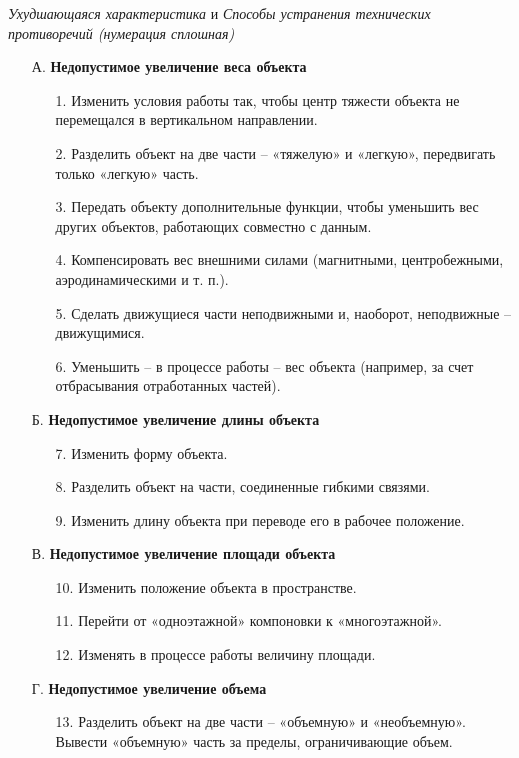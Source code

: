 \documentclass[11pt,a4paper]{article}
\begin{document}
\emph{Ухудшающаяся характеристика} и \emph{Способы устранения технических
  противоречий (нумерация сплошная)} 
\begin{itemize}
\item[А.] \textbf{Недопустимое увеличение веса объекта}
  \begin{itemize}
  \item[1.] Изменить условия работы так, чтобы центр тяжести объекта не
    перемещался в вертикальном направлении.
  \item[2.] Разделить объект на две части -- «тяжелую» и «легкую», передвигать
    только «легкую» часть.
  \item[3.] Передать объекту дополнительные функции, чтобы уменьшить вес
    других объектов, работающих совместно с данным.
  \item[4.] Компенсировать вес внешними силами (магнитными, центробежными,
    аэродинамическими и т. п.).
  \item[5.] Сделать движущиеся части неподвижными и, наоборот, неподвижные --
    движущимися.
  \item[6.] Уменьшить -- в процессе работы -- вес объекта (например, за счет
    отбрасывания отработанных частей).
  \end{itemize}
\item[Б.] \textbf{Недопустимое увеличение длины объекта}
  \begin{itemize}
  \item[7.] Изменить форму объекта.
  \item[8.] Разделить объект на части, соединенные гибкими связями.
  \item[9.] Изменить длину объекта при переводе его в рабочее положение.
  \end{itemize}
\item[В.] \textbf{Недопустимое увеличение площади объекта}
  \begin{itemize}
  \item[10.] Изменить положение объекта в пространстве.
  \item[11.] Перейти от «одноэтажной» компоновки к «многоэтажной».
  \item[12.] Изменять в процессе работы величину площади.
  \end{itemize}
\item[Г.] \textbf{Недопустимое увеличение объема}
  \begin{itemize}
  \item[13.] Разделить объект на две части -- «объемную» и «необъемную».
    Вывести «объемную» часть за пределы, ограничивающие объем.

\end{itemize}
\end{itemize}
\end{document}
